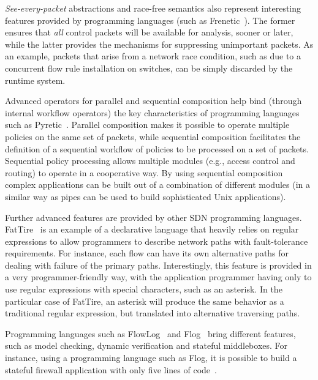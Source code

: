 \textit{See-every-packet} abstractions and race-free semantics also represent interesting features provided 
by programming languages (such as Frenetic~\cite{foster2011}). 
The former ensures that \emph{all} control packets will be available for analysis, sooner or later, while the latter provides the mechanisms for
suppressing unimportant packets. As an example, packets that arise from a network race condition, such as due to a concurrent flow 
rule installation on switches, can be simply discarded by the runtime system.

Advanced operators for parallel and sequential composition help bind (through internal workflow operators) 
the key characteristics of programming languages such as Pyretic~\cite{monsanto2013}. Parallel 
composition makes it possible to operate multiple policies on the same set of packets, while sequential 
composition facilitates the definition of a sequential workflow of policies to be processed on a set of 
packets. Sequential policy processing allows multiple modules (e.g., access control and 
routing) to operate in a cooperative way.
By using sequential composition complex applications can be built out of a combination of different modules (in a similar way as pipes can be used to build sophisticated Unix applications).

Further advanced features are provided by other SDN programming languages.
FatTire~\cite{reitblatt2013} is an example of a declarative language that heavily relies on regular 
expressions to allow programmers to describe network paths with fault-tolerance requirements. For instance, 
each flow can have its own alternative paths for dealing with failure of the primary paths. 
Interestingly, this feature is provided in a very programmer-friendly way, with the application programmer having only to use regular 
expressions with special characters, such as an asterisk. In the particular case of FatTire, an asterisk will produce the same behavior 
as a traditional regular expression, but translated into alternative traversing paths.

Programming languages such as FlowLog~\cite{nelson2014} and Flog~\cite{katta2012} bring 
different features, such as model checking, dynamic verification and stateful middleboxes. For instance, using a programming language such as Flog, it is possible to build a 
stateful firewall application with only five lines of code~\cite{katta2012}.

